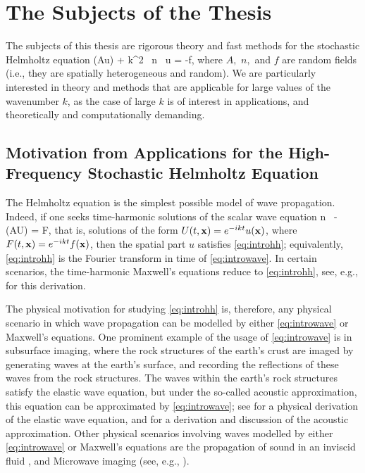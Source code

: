 \section{The Subjects of the Thesis}
The subjects of this thesis are rigorous theory and fast methods for the stochastic Helmholtz equation
\beq\label{eq:introhh}
\grad \cdot \mleft(A\grad u\mright) + k^2 \, n \, u = -f,
\eeq
where $A,$ $n,$ and $f$ are random fields (i.e., they are spatially heterogeneous and random). We are particularly interested in theory and methods that are applicable for large values of the wavenumber $k$, as the case of large $k$ is of interest in applications, and theoretically and computationally demanding.

\subsection{Motivation from Applications for the High-Frequency Stochastic Helmholtz Equation}\label{sec:motivapp}

The Helmholtz equation is the simplest possible model of wave propagation. Indeed, if one seeks time-harmonic solutions of the scalar wave equation
\beq\label{eq:introwave}
n \,  - \grad \cdot\mleft(A\grad U\mright) = F,
\eeq
that is, solutions of the form $U(t,\mathbf{x}) = e^{-ikt}u(\mathbf{x})$, where $F(t,\mathbf{x}) = e^{-ikt}f(\mathbf{x})$, then the spatial part $u$ satisfies \eqref{eq:introhh}; equivalently, \eqref{eq:introhh} is the Fourier transform in time  of \eqref{eq:introwave}. In certain scenarios, the time-harmonic Maxwell's equations reduce to \eqref{eq:introhh}, see, e.g., \cite[Remark 2.1]{MoSp:19} for this derivation.

The physical motivation for studying \eqref{eq:introhh} is, therefore, any physical scenario in which wave propagation can be modelled by either \eqref{eq:introwave} or Maxwell's equations. One prominent example of the usage of \eqref{eq:introwave} is in subsurface imaging, where the rock structures of the earth's crust are imaged by generating waves at the earth's surface, and recording the reflections of these waves from the rock structures. The waves within the earth's rock structures satisfy the elastic wave equation, but under the so-called acoustic approximation, this equation can be approximated by \eqref{eq:introwave}; see \cite[Section 1.2]{Ch:15} for a physical derivation of the elastic wave equation, and \cite[Section 1.2.6]{Ch:15} for a derivation and discussion of the acoustic approximation. Other physical scenarios involving waves modelled by either \eqref{eq:introwave} or Maxwell's equations are the propagation of sound in an inviscid fluid \cite[Section 2.1]{CoKr:13}, and Microwave imaging (see, e.g., \cite[Section 6.4]{BoDoGrSpTo:19}).

